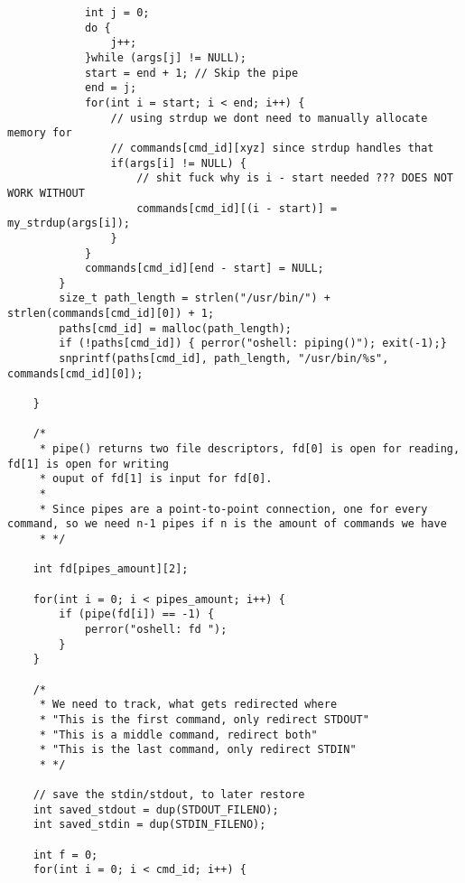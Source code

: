 \documentclass[12pt,english]{article}
\begin{document}
\begin{verbatim}
            int j = 0;
            do {
                j++;
            }while (args[j] != NULL);
            start = end + 1; // Skip the pipe
            end = j;
            for(int i = start; i < end; i++) {
                // using strdup we dont need to manually allocate memory for 
                // commands[cmd_id][xyz] since strdup handles that
                if(args[i] != NULL) {
                    // shit fuck why is i - start needed ??? DOES NOT WORK WITHOUT
                    commands[cmd_id][(i - start)] = my_strdup(args[i]);
                }
            }
            commands[cmd_id][end - start] = NULL;
        }
        size_t path_length = strlen("/usr/bin/") + strlen(commands[cmd_id][0]) + 1;
        paths[cmd_id] = malloc(path_length);
        if (!paths[cmd_id]) { perror("oshell: piping()"); exit(-1);}
        snprintf(paths[cmd_id], path_length, "/usr/bin/%s", commands[cmd_id][0]);        

    }
 
    /*
     * pipe() returns two file descriptors, fd[0] is open for reading, fd[1] is open for writing
     * ouput of fd[1] is input for fd[0].
     *
     * Since pipes are a point-to-point connection, one for every command, so we need n-1 pipes if n is the amount of commands we have
     * */

    int fd[pipes_amount][2];

    for(int i = 0; i < pipes_amount; i++) {
        if (pipe(fd[i]) == -1) {
            perror("oshell: fd ");
        }
    }

    /*
     * We need to track, what gets redirected where
     * "This is the first command, only redirect STDOUT"
     * "This is a middle command, redirect both"
     * "This is the last command, only redirect STDIN"
     * */

    // save the stdin/stdout, to later restore 
    int saved_stdout = dup(STDOUT_FILENO);
    int saved_stdin = dup(STDIN_FILENO);

    int f = 0;
    for(int i = 0; i < cmd_id; i++) {


\end{verbatim}
\end{document}
